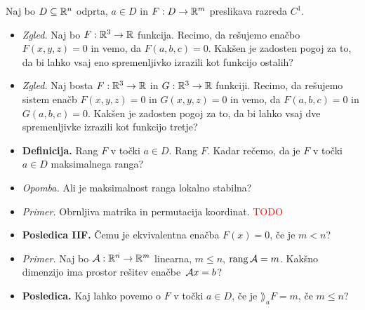 \begin{enumerate}
    Naj bo $D \subseteq \mathbb{R}^n$ odprta, $a \in D$ in $F: D \to \mathbb{R}^m$ preslikava razreda $C^1$.
    \begin{itemize}
        \item \colorbox{yellow!30}{\emph{Zgled.}} Naj bo $F: \mathbb{R}^3 \to \mathbb{R}$ funkcija. Recimo, da rešujemo enačbo $F(x,y,z) = 0$ in vemo, da $F(a,b,c) = 0$. Kakšen je zadosten pogoj za to, da bi lahko vsaj eno spremenljivko izrazili kot funkcijo ostalih?
        \item \colorbox{yellow!30}{\emph{Zgled.}} Naj bosta $F: \mathbb{R}^3 \to \mathbb{R}$ in $G: \mathbb{R}^3 \to \mathbb{R}$ funkciji. Recimo, da rešujemo sistem enačb $F(x,y,z) = 0$ in $G(x,y,z) = 0$ in vemo, da  $F(a,b,c) = 0$ in  $G(a,b,c) = 0$. Kakšen je zadosten pogoj za to, da bi lahko vsaj dve spremenljivke izrazili kot funkcijo tretje?
        \item \colorbox{purple!30}{\textbf{Definicija.}} Rang $F$ v točki $a \in D$. Rang $F$. Kadar rečemo, da je $F$ v točki $a \in D$ maksimalnega ranga?
        \item \colorbox{yellow!30}{\emph{Opomba.}} Ali je maksimalnost ranga lokalno stabilna?
        \item \colorbox{yellow!30}{\emph{Primer.}} Obrnljiva matrika in permutacija koordinat. \textcolor{red}{TODO}
        \item \colorbox{orange!30}{\textbf{Posledica IIF.}} Čemu je ekvivalentna enačba $F(x) = 0$, če je $m < n$?
        \item \colorbox{yellow!30}{\emph{Primer.}} Naj bo $\mathcal{A}: \mathbb{R}^n \to \mathbb{R}^m$ linearna, $m \leq n$, $\operatorname{rang} \mathcal{A} = m$. Kakšno dimenzijo ima prostor rešitev enačbe~$\mathcal{A}x=b$?
        \item \colorbox{orange!30}{\textbf{Posledica.}} Kaj lahko povemo o $F$ v točki $a \in D$, če je $\rang_a F = m$, če $m \leq n$?
    \end{itemize}
\end{enumerate}

\newpage
